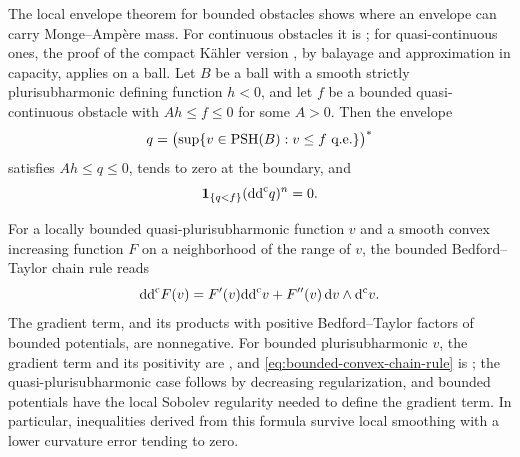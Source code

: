 The local envelope theorem for bounded obstacles shows where an envelope can carry Monge--Amp\`ere mass. For continuous obstacles it is \cite[Exercise~5.10]{GZ17}; for quasi-continuous ones, the proof of the compact K\"ahler version \cite[Theorem~2.4.4]{SGPT}, by balayage and approximation in capacity, applies on a ball. Let $B$ be a ball with a smooth strictly plurisubharmonic defining function $h<0$, and let $f$ be a bounded quasi-continuous obstacle with $Ah\leq f\leq0$ for some $A>0$. Then the envelope
\[
 q=\bigl(\sup\{v\in\PSH(B):v\leq f\ \text{q.e.}\}\bigr)^*
\]
satisfies $Ah\leq q\leq0$, tends to zero at the boundary, and
\begin{equation}\label{eq:local-envelope-contact}
 \mathbf1_{\{q<f\}}(\mathrm{dd}^{\mathrm{c}} q)^n=0.
\end{equation}

For a locally bounded quasi-plurisubharmonic function $v$ and a smooth convex increasing function $F$ on a neighborhood of the range of $v$, the bounded Bedford--Taylor chain rule reads
\begin{equation}\label{eq:bounded-convex-chain-rule}
 \mathrm{dd}^{\mathrm{c}} F(v)=F'(v)\mathrm{dd}^{\mathrm{c}} v+F''(v)\,\mathrm{d}v\wedge\mathrm d^{\mathrm c} v.
\end{equation}
The gradient term, and its products with positive Bedford--Taylor factors of bounded potentials, are nonnegative. For bounded plurisubharmonic $v$, the gradient term and its positivity are \cite[Definition~3.2 and Proposition~3.3]{GZ17}, and \eqref{eq:bounded-convex-chain-rule} is \cite[Exercise~3.4]{GZ17}; the quasi-plurisubharmonic case follows by decreasing regularization, and bounded potentials have the local Sobolev regularity needed to define the gradient term. In particular, inequalities derived from this formula survive local smoothing with a lower curvature error tending to zero.

